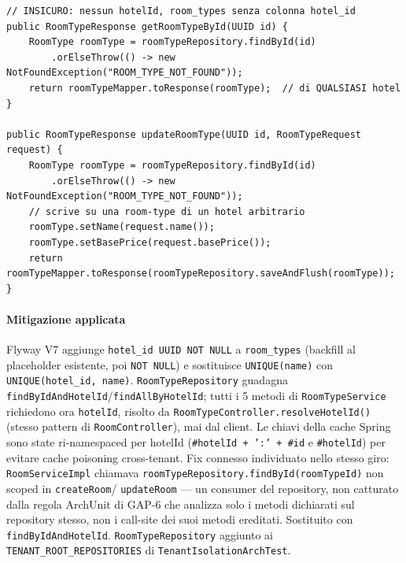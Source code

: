 ﻿\documentclass[a4paper,12pt]{report}
\begin{document}
\begin{insecurebox}[title={Codice Vulnerabile --- RoomTypeServiceImpl.java (baseline)}]
\begin{lstlisting}[style=java]
// INSICURO: nessun hotelId, room_types senza colonna hotel_id
public RoomTypeResponse getRoomTypeById(UUID id) {
    RoomType roomType = roomTypeRepository.findById(id)
        .orElseThrow(() -> new NotFoundException("ROOM_TYPE_NOT_FOUND"));
    return roomTypeMapper.toResponse(roomType);  // di QUALSIASI hotel
}

public RoomTypeResponse updateRoomType(UUID id, RoomTypeRequest request) {
    RoomType roomType = roomTypeRepository.findById(id)
        .orElseThrow(() -> new NotFoundException("ROOM_TYPE_NOT_FOUND"));
    // scrive su una room-type di un hotel arbitrario
    roomType.setName(request.name());
    roomType.setBasePrice(request.basePrice());
    return roomTypeMapper.toResponse(roomTypeRepository.saveAndFlush(roomType));
}
\end{lstlisting}
\end{insecurebox}

\paragraph{Mitigazione applicata}
Flyway V7 aggiunge \texttt{hotel\_id UUID NOT NULL} a \texttt{room\_types} (backfill
al placeholder esistente, poi \texttt{NOT NULL}) e sostituisce \texttt{UNIQUE(name)}
con \texttt{UNIQUE(hotel\_id, name)}. \texttt{RoomTypeRepository} guadagna
\texttt{findByIdAndHotelId}/\texttt{findAllByHotelId}; tutti i 5 metodi di
\texttt{RoomTypeService} richiedono ora \texttt{hotelId}, risolto da
\texttt{RoomTypeController.resolveHotelId()} (stesso pattern di \texttt{RoomController}),
mai dal client. Le chiavi della cache Spring sono state ri-namespaced per hotelId
(\texttt{\#hotelId + ':' + \#id} e \texttt{\#hotelId}) per evitare cache poisoning
cross-tenant. Fix connesso individuato nello stesso giro: \texttt{RoomServiceImpl}
chiamava \texttt{roomTypeRepository.findById(roomTypeId)} non scoped in \texttt{createRoom}/
\texttt{updateRoom} --- un consumer del repository, non catturato dalla regola ArchUnit
di GAP-6 che analizza solo i metodi dichiarati sul repository stesso, non i call-site dei
suoi metodi ereditati. Sostituito con \texttt{findByIdAndHotelId}. \texttt{RoomTypeRepository}
aggiunto ai \texttt{TENANT\_ROOT\_REPOSITORIES} di \texttt{TenantIsolationArchTest}.
\end{document}
